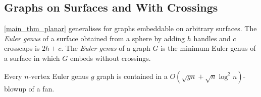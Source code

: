 \documentclass{patmorin}
\renewcommand{\geq}{\geqslant}
\renewcommand{\leq}{\leqslant}
\newcommand{\david}[1]{{\color{orange} David: #1}}
\newcommand{\defin}[1]{\emph{\textcolor{brightmaroon}{#1}}}
\DeclareMathOperator{\pw}{pw}
\begin{document}



\subsection{Graphs on Surfaces and With Crossings}

\cref{main_thm_planar} generalises for graphs embeddable on arbitrary surfaces. The \defin{Euler genus} of a surface obtained from a sphere by adding $h$ handles and $c$ crosscaps is $2h+c$. The \defin{Euler genus} of a graph $G$ is the minimum Euler genus of a surface in which $G$ embeds without crossings.

\begin{thm}\label{main_thm_genus}
  Every $n$-vertex Euler genus $g$ graph is contained in a $O(\sqrt{gn}+\sqrt{n}\log^2 n)$-blowup of a fan.
\end{thm}
\end{document}
